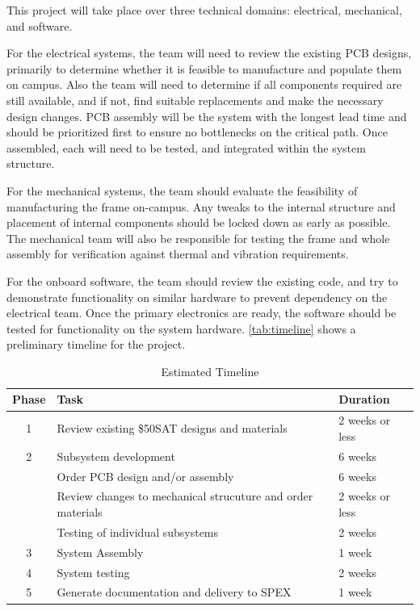 \documentclass[conference]{IEEEtran} %
\begin{document}
This project will take place over three technical domains: electrical, mechanical, and software.

For the electrical systems, the team will need to review the existing PCB designs, primarily to determine whether it is feasible to manufacture and populate them on campus.
Also the team will need to determine if all components required are still available, and if not, find suitable replacements and make the necessary design changes.
PCB assembly will be the system with the longest lead time and should be prioritized first to ensure no bottlenecks on the critical path.
Once assembled, each will need to be tested, and integrated within the system structure.

For the mechanical systems, the team should evaluate the feasibility of manufacturing the frame on-campus.
Any tweaks to the internal structure and placement of internal components should be locked down as early as possible.
The mechanical team will also be responsible for testing the frame and whole assembly for verification against thermal and vibration requirements.

For the onboard software, the team should review the existing code, and try to demonstrate functionality on similar hardware to prevent dependency on the electrical team.
Once the primary electronics are ready, the software should be tested for functionality on the system hardware.
\autoref{tab:timeline} shows a preliminary timeline for the project.

\begin{table}
  \caption{Estimated Timeline}
  \centering
  \begin{tabularx}{\columnwidth}{@{}cXl@{}} \toprule
    Phase & Task & Duration \\ \midrule
    1 & Review existing \$50SAT designs and materials & 2 weeks or less \\
    2 & Subsystem development & 6 weeks \\
      & Order PCB design and/or assembly & 6 weeks \\
      & Review changes to mechanical strucuture and order materials & 2 weeks or less \\
      & Testing of individual subsystems & 2 weeks \\
    3 & System Assembly & 1 week  \\
    4 & System testing & 2 weeks  \\
    5 & Generate documentation and delivery to SPEX & 1 week  \\
    \bottomrule
  \end{tabularx}
\label{tab:timeline}
\end{table}
\end{document}
